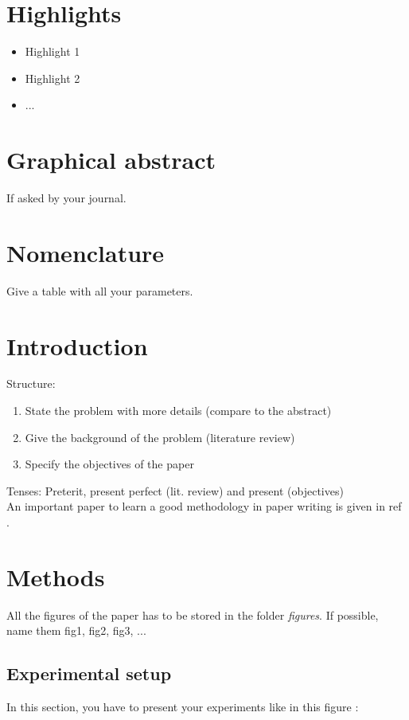 \documentclass[12pt,a4paper]{article}
\begin{document}
\clearpage
\section*{Highlights}
\begin{itemize}
\item Highlight 1
\item Highlight 2
\item ...
\end{itemize}
\clearpage

\section*{Graphical abstract}
If asked by your journal.

\clearpage

\section*{Nomenclature}
Give a table with all your parameters.

\clearpage
\section{Introduction}

Structure:
\begin{enumerate}
\item	State the problem with more details (compare to the abstract)
\item Give the background of the problem (literature review)
\item	Specify the objectives of the paper
\end{enumerate}

Tenses: Preterit, present perfect (lit. review) and present (objectives)\\

An important paper to learn a good methodology in paper writing is given in ref \cite{Whitesides2004}. 

\section{Methods}
All the figures of the paper has to be stored in the folder \textit{figures}. If possible, name them fig1, fig2, fig3, ...\\

\subsection{Experimental setup}
In this section, you have to present your experiments like in this figure :
\end{document}

